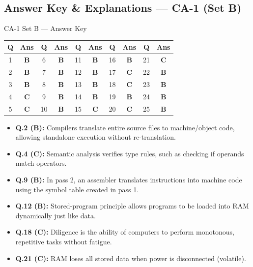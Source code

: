 


\newpage
\subsection*{Answer Key \& Explanations --- CA-1 (Set B)}

\begin{answerkeytable}{CA-1 Set B --- Answer Key}
\begin{tabular}{*{10}{c}}
\toprule
\textbf{Q} & \textbf{Ans} & \textbf{Q} & \textbf{Ans} & \textbf{Q} & \textbf{Ans} & \textbf{Q} & \textbf{Ans} & \textbf{Q} & \textbf{Ans} \\
\midrule
1 & \textbf{B} & 6 & \textbf{B} & 11 & \textbf{B} & 16 & \textbf{B} & 21 & \textbf{C} \\
2 & \textbf{B} & 7 & \textbf{B} & 12 & \textbf{B} & 17 & \textbf{C} & 22 & \textbf{B} \\
3 & \textbf{B} & 8 & \textbf{B} & 13 & \textbf{B} & 18 & \textbf{C} & 23 & \textbf{B} \\
4 & \textbf{C} & 9 & \textbf{B} & 14 & \textbf{B} & 19 & \textbf{B} & 24 & \textbf{B} \\
5 & \textbf{C} & 10 & \textbf{B} & 15 & \textbf{C} & 20 & \textbf{C} & 25 & \textbf{B} \\
\bottomrule
\end{tabular}
\end{answerkeytable}

\begin{expbox}
\begin{itemize}[leftmargin=5mm]
    \item \textbf{Q.2 (B):} Compilers translate entire source files to machine/object code, allowing standalone execution without re-translation.
    \item \textbf{Q.4 (C):} Semantic analysis verifies type rules, such as checking if operands match operators.
    \item \textbf{Q.9 (B):} In pass 2, an assembler translates instructions into machine code using the symbol table created in pass 1.
    \item \textbf{Q.12 (B):} Stored-program principle allows programs to be loaded into RAM dynamically just like data.
    \item \textbf{Q.18 (C):} Diligence is the ability of computers to perform monotonous, repetitive tasks without fatigue.
    \item \textbf{Q.21 (C):} RAM loses all stored data when power is disconnected (volatile).
\end{itemize}
\end{expbox}

\newpage
